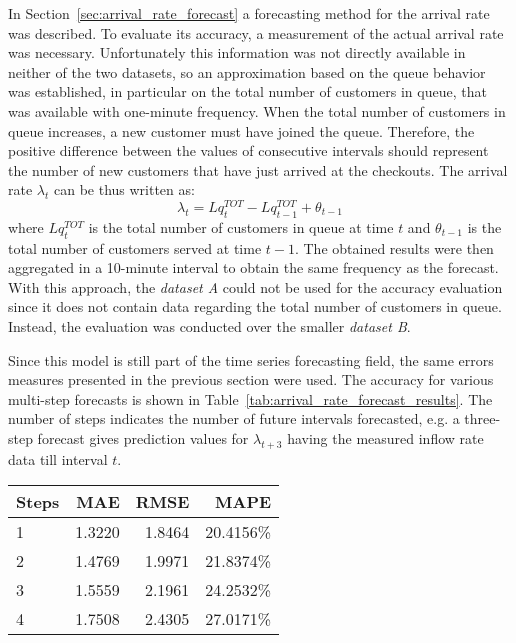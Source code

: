 In Section~\ref{sec:arrival_rate_forecast} a forecasting method for the arrival rate was described. To evaluate its accuracy, a measurement of the actual arrival rate was necessary. Unfortunately this information was not directly available in neither of the two datasets, so an approximation based on the queue behavior was established, in particular on the total number of customers in queue, that was available with one-minute frequency. When the total number of customers in queue increases, a new customer must have joined the queue. Therefore, the positive difference between the values of consecutive intervals should represent the number of new customers that have just arrived at the checkouts. The arrival rate \( \lambda_t \) can be thus written as:
\begin{equation}
  \lambda_t = Lq_t^{TOT} - Lq_{t-1}^{TOT} + \theta_{t-1}
\end{equation}
where \( Lq_t^{TOT} \) is the total number of customers in queue at time \( t \) and \( \theta_{t-1} \) is the total number of customers served at time \( t-1 \). The obtained results were then aggregated in a 10-minute interval to obtain the same frequency as the forecast. With this approach, the \emph{dataset A} could not be used for the accuracy evaluation since it does not contain data regarding the total number of customers in queue. Instead, the evaluation was conducted over the smaller \emph{dataset B}.

Since this model is still part of the time series forecasting field, the same errors measures presented in the previous section were used. The accuracy for various multi-step forecasts is shown in Table~\ref{tab:arrival_rate_forecast_results}. The number of steps indicates the number of future intervals forecasted, e.g. a three-step forecast gives prediction values for \( \lambda_{t+3} \) having the measured inflow rate data till interval \( t \).

\begin{center}
  \begin{tabular}{ l r r r }
    \hline
    Steps & MAE    & RMSE   & MAPE      \\
    \hline
    1     & 1.3220 & 1.8464 & 20.4156\% \\
    2     & 1.4769 & 1.9971 & 21.8374\% \\
    3     & 1.5559 & 2.1961 & 24.2532\% \\
    4     & 1.7508 & 2.4305 & 27.0171\% \\
    \hline
  \end{tabular}
\end{center}

